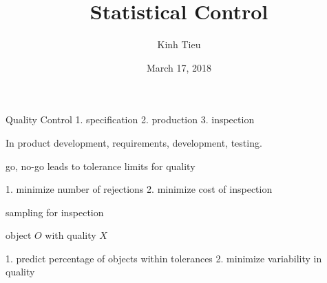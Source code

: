 \documentclass{article}
\begin{document}
\title{Statistical Control}
\author{Kinh Tieu}
\date{March 17, 2018}
\maketitle

Quality Control
1. specification
2. production
3. inspection

In product development, requirements, development, testing.

go, no-go leads to tolerance limits for quality

1. minimize number of rejections
2. minimize cost of inspection

sampling for inspection

object $O$ with quality $X$

1. predict percentage of objects within tolerances
2. minimize variability in quality
\end{document}
